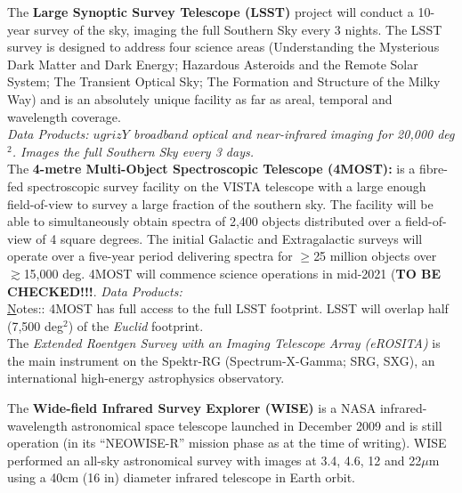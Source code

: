\begin{framed}
The {\bf Large Synoptic Survey Telescope (LSST)} project will conduct
a 10-year survey of the sky, imaging the full Southern Sky every 3
nights. The LSST survey is designed to address four science areas
(Understanding the Mysterious Dark Matter and Dark Energy; Hazardous
Asteroids and the Remote Solar System; The Transient Optical Sky; The
Formation and Structure of the Milky Way) and is an absolutely unique
facility as far as areal, temporal and wavelength coverage.\\
{\it Data Products: $ugrizY$ broadband optical and near-infrared imaging for 20,000 deg$^2$. 
Images the full Southern Sky every 3 days. } \\

The {\bf 4-metre Multi-Object Spectroscopic Telescope  (4MOST):} 
is a fibre-fed spectroscopic survey facility on the VISTA telescope with a large enough field-of-view to survey a large fraction of the southern sky. The facility will be able to simultaneously obtain spectra of 2,400 objects distributed over a field-of-view of 4 square degrees. 
The initial Galactic and Extragalactic surveys will operate over a five-year period delivering spectra for $\geq$25 million objects over 
$\gtrsim$15,000 deg. 4MOST will commence science operations in mid-2021 ({\bf TO BE CHECKED!!!}. 
{\it Data Products: } \\

{\underline Notes::} 4MOST has full access to the full LSST footprint. LSST will overlap half (7,500 deg$^2$) of the {\it Euclid} footprint. \\

The {\it Extended Roentgen Survey with an Imaging Telescope Array (eROSITA)} is the main instrument on the 
Spektr-RG (Spectrum-X-Gamma; SRG, SXG), an international high-energy astrophysics observatory. 

\hrulefill 

The {\bf Wide-field Infrared Survey Explorer (WISE)} is a NASA
infrared-wavelength astronomical space telescope launched in December
2009 and is still operation (in its ``NEOWISE-R'' mission phase as at
the time of writing). WISE performed an all-sky astronomical survey
with images at 3.4, 4.6, 12 and 22$\mu$m using a 40cm (16 in) diameter
infrared telescope in Earth orbit. 


\end{framed}
